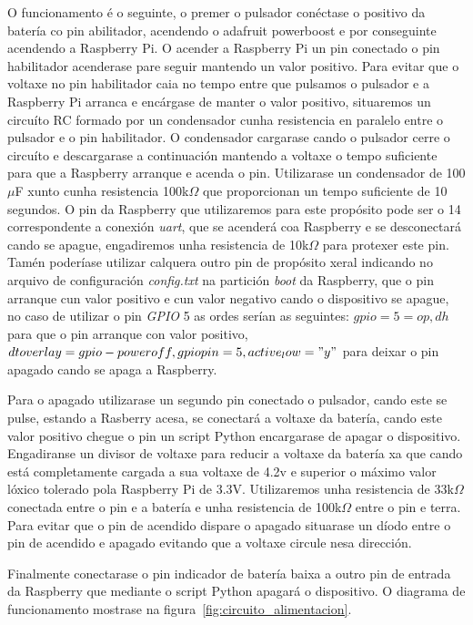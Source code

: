 \begin{itemize}
    O funcionamento é o seguinte, o premer o pulsador conéctase o positivo da batería co pin abilitador, acendendo o adafruit powerboost e por conseguinte acendendo a Raspberry Pi. O acender a Raspberry Pi un pin conectado o pin habilitador acenderase pare seguir mantendo un valor positivo. Para evitar que o voltaxe no pin habilitador caia no tempo entre que pulsamos o pulsador e a Raspberry Pi arranca e encárgase de manter o valor positivo, situaremos un circuíto RC formado por un condensador cunha resistencia en paralelo entre o pulsador e o pin habilitador. O condensador cargarase cando o pulsador cerre o circuíto e descargarase a continuación mantendo a voltaxe o tempo suficiente para que a Raspberry arranque e acenda o pin. Utilizarase un condensador de 100\(\mu\)F xunto cunha resistencia 100k\(\Omega\) que proporcionan un tempo suficiente de 10 segundos. O pin da Raspberry que utilizaremos para este propósito pode ser o 14 correspondente a conexión \emph{uart}, que se acenderá coa Raspberry e se desconectará cando se apague, engadiremos unha resistencia de 10k\(\Omega\) para protexer este pin. Tamén poderíase utilizar calquera outro pin de propósito xeral indicando no arquivo de configuración \emph{config.txt} na partición \emph{boot} da Raspberry, que o pin arranque cun valor positivo e cun valor negativo cando o dispositivo se apague, no caso de utilizar o pin \emph{GPIO} 5 as ordes serían as seguintes: \emph{$gpio=5=op,dh$} para que o pin arranque con valor positivo, \emph{$dtoverlay=gpio-poweroff,gpiopin=5,active_low="y"$} para deixar o pin apagado cando se apaga a Raspberry.

    Para o apagado utilizarase un segundo pin conectado o pulsador, cando este se pulse, estando a Rasberry acesa, se conectará a voltaxe da batería, cando este valor positivo chegue o pin un script Python encargarase de apagar o dispositivo. Engadiranse un divisor de voltaxe para reducir a voltaxe da batería xa que cando está completamente cargada a sua voltaxe de 4.2v e superior o máximo valor lóxico tolerado pola Raspberry Pi de 3.3V. Utilizaremos unha resistencia de 33k\(\Omega\) conectada entre o pin e a batería e unha resistencia de 100k\(\Omega\) entre o pin e terra. Para evitar que o pin de acendido dispare o apagado situarase un díodo entre o pin de acendido e apagado evitando que a voltaxe circule nesa dirección.

    Finalmente conectarase o pin indicador de batería baixa a outro pin de entrada da Raspberry que mediante o script Python apagará o dispositivo. O diagrama de funcionamento mostrase na figura~\ref{fig:circuito_alimentacion}.


\end{itemize}
